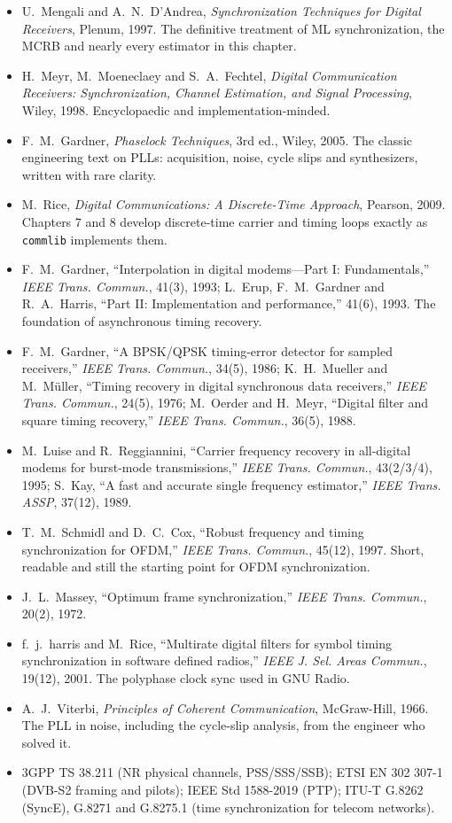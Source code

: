 \furtherreading
\begin{itemize}
\item U.~Mengali and A.~N.~D'Andrea, \emph{Synchronization Techniques for Digital Receivers}, Plenum,
1997. The definitive treatment of ML synchronization, the MCRB and nearly every estimator in this
chapter.
\item H.~Meyr, M.~Moeneclaey and S.~A.~Fechtel, \emph{Digital Communication Receivers: Synchronization,
Channel Estimation, and Signal Processing}, Wiley, 1998. Encyclopaedic and implementation-minded.
\item F.~M.~Gardner, \emph{Phaselock Techniques}, 3rd ed., Wiley, 2005. The classic engineering text on
PLLs: acquisition, noise, cycle slips and synthesizers, written with rare clarity.
\item M.~Rice, \emph{Digital Communications: A Discrete-Time Approach}, Pearson, 2009. Chapters 7 and 8
develop discrete-time carrier and timing loops exactly as \texttt{commlib} implements them.
\item F.~M.~Gardner, ``Interpolation in digital modems---Part I: Fundamentals,'' \emph{IEEE Trans.
Commun.}, 41(3), 1993; L.~Erup, F.~M.~Gardner and R.~A.~Harris, ``Part II: Implementation and
performance,'' 41(6), 1993. The foundation of asynchronous timing recovery.
\item F.~M.~Gardner, ``A BPSK/QPSK timing-error detector for sampled receivers,'' \emph{IEEE Trans.
Commun.}, 34(5), 1986; K.~H.~Mueller and M.~M\"uller, ``Timing recovery in digital synchronous data
receivers,'' \emph{IEEE Trans. Commun.}, 24(5), 1976; M.~Oerder and H.~Meyr, ``Digital filter and square
timing recovery,'' \emph{IEEE Trans. Commun.}, 36(5), 1988.
\item M.~Luise and R.~Reggiannini, ``Carrier frequency recovery in all-digital modems for burst-mode
transmissions,'' \emph{IEEE Trans. Commun.}, 43(2/3/4), 1995; S.~Kay, ``A fast and accurate single
frequency estimator,'' \emph{IEEE Trans. ASSP}, 37(12), 1989.
\item T.~M.~Schmidl and D.~C.~Cox, ``Robust frequency and timing synchronization for OFDM,''
\emph{IEEE Trans. Commun.}, 45(12), 1997. Short, readable and still the starting point for OFDM
synchronization.
\item J.~L.~Massey, ``Optimum frame synchronization,'' \emph{IEEE Trans. Commun.}, 20(2), 1972.
\item f.~j.~harris and M.~Rice, ``Multirate digital filters for symbol timing synchronization in
software defined radios,'' \emph{IEEE J. Sel. Areas Commun.}, 19(12), 2001. The polyphase clock sync
used in GNU Radio.
\item A.~J.~Viterbi, \emph{Principles of Coherent Communication}, McGraw-Hill, 1966. The PLL in noise,
including the cycle-slip analysis, from the engineer who solved it.
\item 3GPP TS 38.211 (NR physical channels, PSS/SSS/SSB); ETSI EN 302 307-1 (DVB-S2 framing and pilots);
IEEE Std 1588-2019 (PTP); ITU-T G.8262 (SyncE), G.8271 and G.8275.1 (time synchronization for
telecom networks).
\end{itemize}
